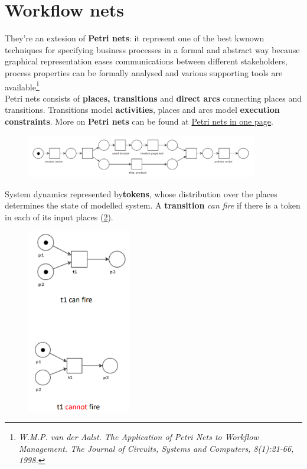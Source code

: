 \documentclass[10pt,a4paper]{report}
\begin{document}
\section{Workflow nets}
They're an extesion of \textbf{Petri nets}: it represent one of the best kwnown techniques  for specifying business processes in a formal and abstract way because graphical representation eases communications between different stakeholders, process properties can be formally analysed and various supporting tools are available\footnote{\textit{W.M.P. van der Aalst. The Application of Petri Nets to Workflow Management. The Journal of Circuits, Systems and Computers, 8(1):21-66, 1998.}}\\
Petri nets consists of \textbf{places, transitions} and \textbf{direct arcs} connecting places and transitions. Transitions model \textbf{activities}, places and arcs model \textbf{execution constraints}. More on \textbf{Petri nets} can be found at \href{http://pages.di.unipi.it/brogi/note.pdf}{Petri nets in one page}.
\begin{figure}[h]
	\centering
	\includegraphics[width=0.9\textwidth]{image78}
	\caption{}
	\label{image78}
\end{figure}
System dynamics represented by\textbf{tokens}, whose distribution over the places determines the state of modelled system. A \textbf{transition} \textit{can fire} if there is a token in each of its input places (\ref{image79}). 
\begin{figure}[h]
	\centering
	\includegraphics[width=0.4\textwidth]{image79}
	\caption{}
	\label{image79}
\end{figure}
\end{document}
